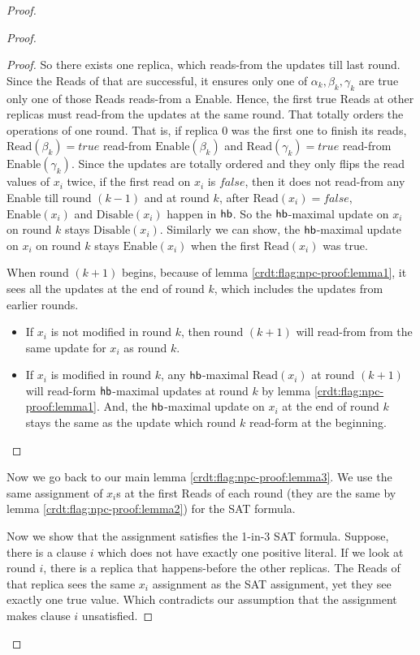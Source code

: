 \begin{proof}
\begin{proof}
\begin{proof}
    So there exists one replica, which reads-from the updates till last round. Since the \textrm{Read}s of that are successful, it ensures only one of $\alpha_k, \beta_k, \gamma_k$ are true \ie only one of those \textrm{Read}s reads-from a \textrm{Enable}. Hence, the first true \textrm{Read}s at other replicas must read-from the updates at the same round. That totally orders the operations of one round. That is, if replica 0 was the first one to finish its reads, $\mathrm{Read}(\beta_k) = true$ read-from $\mathrm{Enable}(\beta_k)$ and $\mathrm{Read}(\gamma_k) = true$ read-from $\mathrm{Enable}(\gamma_k)$. Since the updates are totally ordered and they only flips the read values of $x_i$ twice, \ie if the first read on $x_i$ is $false$, then it does not read-from any \textrm{Enable} till round $(k-1)$ and at round $k$, after $\mathrm{Read}(x_i) = false$, $\mathrm{Enable}(x_i)$ and $\mathrm{Disable}(x_i)$ happen in $\textsf{hb}$. So the $\textsf{hb}$-maximal update on $x_i$ on round $k$ stays $\mathrm{Disable}(x_i)$. Similarly we can show, the $\textsf{hb}$-maximal update on $x_i$ on round $k$ stays $\mathrm{Enable}(x_i)$ when the first $\mathrm{Read}(x_i)$ was true.

    When round $(k+1)$ begins, because of lemma \ref{crdt:flag:npc-proof:lemma1}, it sees all the updates at the end of round $k$, which includes the updates from earlier rounds.
    
    \begin{itemize}
      \item If $x_i$ is not modified in round $k$, then round $(k+1)$ will read-from from the same update for $x_i$ as round $k$.
      \item If $x_i$ is modified in round $k$, any $\textsf{hb}$-maximal $\mathrm{Read}(x_i)$ at round $(k+1)$ will read-form $\textsf{hb}$-maximal updates at round $k$ by lemma \ref{crdt:flag:npc-proof:lemma1}. And, the $\textsf{hb}$-maximal update on $x_i$ at the end of round $k$ stays the same as the update which round $k$ read-form at the beginning. 
    \end{itemize}
  \end{proof}

  Now we go back to our main lemma \ref{crdt:flag:npc-proof:lemma3}. We use the same assignment of $x_i$s at the first \textrm{Read}s of each round (they are the same by lemma \ref{crdt:flag:npc-proof:lemma2}) for the SAT formula.

  Now we show that the assignment satisfies the 1-in-3 SAT formula. Suppose, there is a clause $i$ which does not have exactly one positive literal. If we look at round $i$, there is a replica that happens-before the other replicas. The \textrm{Read}s of that replica sees the same $x_i$ assignment as the SAT assignment, yet they see exactly one true value. Which contradicts our assumption that the assignment makes clause $i$ unsatisfied.
\end{proof}


\end{proof}
